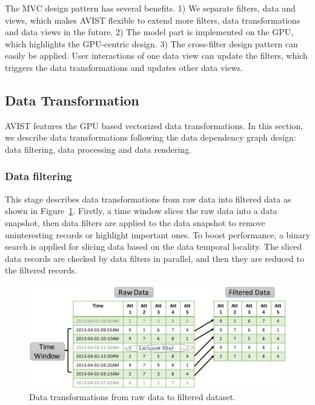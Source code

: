 The MVC design pattern has several benefits. 1) We separate filters, data and views, which makes AVIST flexible to extend more filters, data transformations and data views in the future.  2) The model part is implemented on the GPU, which highlights the GPU-centric design. 3) The cross-filter design pattern can easily be  applied. User interactions of one data view can update the filters, which triggers the data transformations and updates other data views.


\subsection{Data Transformation}
AVIST features the GPU based vectorized data transformations. In this section, we describe data transformations following the data dependency graph design: data filtering, data processing and data rendering.

\subsubsection{Data filtering} 
This stage describes data transformations from raw data into filtered data as shown in Figure~\ref{fig:dataTran1}.
Firstly, a time window slices the raw data into a data snapshot, then data  filters are applied to the data snapshot to remove uninteresting records or highlight important ones. To boost performance, a binary search is applied for slicing data based on the data temporal locality.  The sliced data records are checked by data filters in parallel, and then they are reduced to the filtered records.   

\begin{figure}[htb]
	\centering
	\includegraphics[width=1.0\linewidth]{pic/trans.pdf}
	\parbox[t]{1.0\columnwidth}{\relax
	}
	\caption{\label{fig:dataTran1} Data transformations from raw data to filtered dataset.}
\end{figure} 




